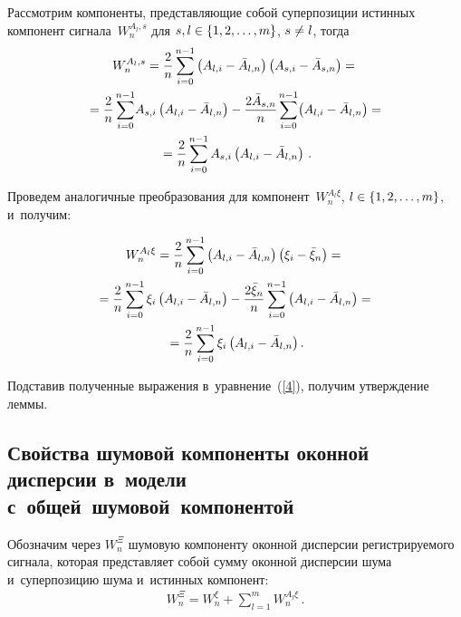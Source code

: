 \begin{multicols}{2}
Рассмотрим компоненты, представляющие собой суперпозиции истинных 
компонент сигнала~$W_n^{A_l,s}$ для $s, l \hm\in \{ 1, 2, \ldots, m\}$, $s\hm\neq l $, 
тогда
\begin{multline*}
W_n^{A_l,s} =  \displaystyle\frac{\displaystyle 2\mathstrut}{\displaystyle n\mathstrut}\sum\limits_{i=0}^{n-1}\left( A_{l,i} - 
\bar{A}_{l,n}\right) \left( A_{s,i} - \bar{A}_{s,n}\right)  ={}
\\
{}= \displaystyle\frac{\displaystyle 2\mathstrut}{\displaystyle n\mathstrut}\sum\limits_{i=0}^{n-1}\!A_{s,i}\left( A_{l,i} - \bar{A}_{l,n}\right) - 
 \displaystyle\frac{\displaystyle 2\bar{A}_{s,n}\mathstrut}{\displaystyle n\mathstrut}\hspace*{-0.6pt}\sum\limits_{i=0}^{n-1}\!\left( A_{l,i} - \bar{A}_{l,n}\right) = {}\\
 {}=
 \displaystyle\frac{\displaystyle 2\mathstrut}{\displaystyle n\mathstrut}\sum\limits_{i=0}^{n-1}A_{s,i}\left( A_{l,i} - \bar{A}_{l,n}\right)\,.
\end{multline*}


Проведем аналогичные преобразования для компонент~$W_n^{A_l\xi}$, 
$l \hm\in \{ 1, 2, \ldots, m\}$, и~получим:

\noindent
\begin{multline*}
W_n^{A_l\xi} =  \displaystyle\frac{\displaystyle 2\mathstrut}{\displaystyle n\mathstrut}\sum\limits_{i=0}^{n-1}\left( A_{l,i} - 
\bar{A}_{l,n}\right) \left( \xi_{i} - \bar{\xi}_{n}\right)  ={}
\\
{}= \displaystyle\frac{\displaystyle 2\mathstrut}{\displaystyle n\mathstrut}\sum\limits_{i=0}^{n-1}\xi_{i}\left( A_{l,i} - \bar{A}_{l,n}\right) -  
\displaystyle\frac{\displaystyle 2\bar{\xi}_{n}\mathstrut}{\displaystyle n\mathstrut}\sum\limits_{i=0}^{n-1}\left( A_{l,i} - \bar{A}_{l,n}\right) = {}\\
{}=
\displaystyle\frac{\displaystyle 2\mathstrut}{\displaystyle n\mathstrut}\sum\limits_{i=0}^{n-1}\xi_{i}\left( A_{l,i} - \bar{A}_{l,n}\right).
\end{multline*}

Подставив полученные выражения в~уравнение~(\ref{4}), получим утверждение леммы.


\subsection{Свойства шумовой компоненты оконной дисперсии в~модели 
с~общей~шумовой~компонентой}

Обозначим через $W_{n}^{\Xi}$ шумовую компоненту оконной дисперсии 
регистрируемого сигнала, которая представляет собой сумму оконной 
дис\-пер\-сии шума и~суперпозицию шума и~истинных компонент:
\begin{equation}
\label{5}
\begin{matrix}
W_{n}^{\Xi}= W_n^{\xi} + \sum\limits_{l=1}^{m}W_n^{A_l\xi}\,.
\end{matrix}
\end{equation}


\end{multicols}
